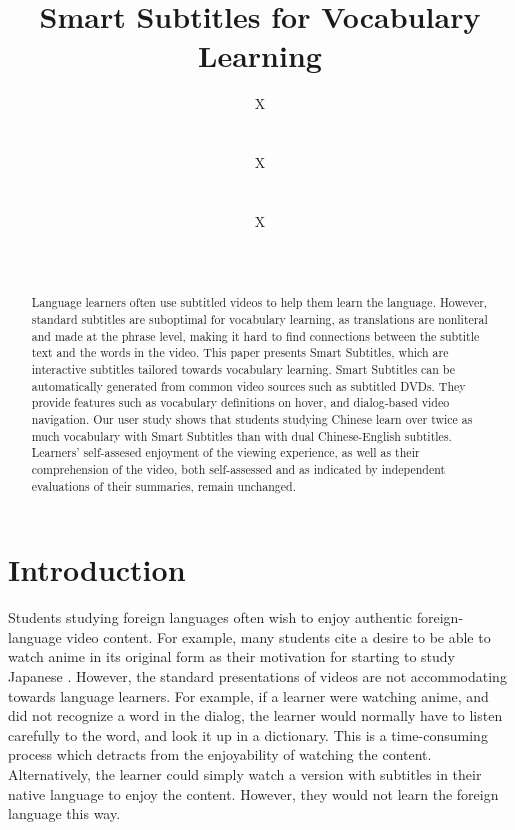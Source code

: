 \documentclass{sigchi}
\begin{document}
\title{Smart Subtitles for Vocabulary Learning}

\author{
  \alignauthor X\\
    \\
    \\
  \alignauthor X \\
    \\
    \\
  \alignauthor X\\
    \\
    \\
}

\maketitle

\begin{abstract}
Language learners often use subtitled videos to help
them learn the language. However, standard subtitles
are suboptimal for vocabulary learning, as
translations are nonliteral and made at the phrase
level, making it hard to find connections between the
subtitle text and the words in the video. This paper
presents Smart Subtitles, which are interactive subtitles
tailored towards vocabulary learning.
Smart Subtitles can be automatically generated from common video sources
such as subtitled DVDs.
They provide features such as vocabulary definitions on hover, and
dialog-based video navigation. Our user study shows
that students studying Chinese learn over twice as much
vocabulary with Smart Subtitles than with dual
Chinese-English subtitles. Learners' self-assesed enjoyment
of the viewing experience, as well as their comprehension
of the video, both self-assessed and
as indicated by independent evaluations of their summaries,
remain unchanged.
\end{abstract}



\section{Introduction}

Students studying foreign languages often wish to enjoy authentic foreign-language video content. For example, many students cite a desire to be able to watch anime in its original form as their motivation for starting to study Japanese \cite{anime}. However, the standard presentations of videos are not accommodating towards language learners. For example, if a learner were watching anime, and did not recognize a word in the dialog, the learner would normally have
to listen carefully to the word, and look it up in a dictionary. This is a time-consuming process which detracts from the enjoyability of watching the content. Alternatively, the learner could simply watch a version with subtitles in their native language to enjoy the content. However, they would not learn the foreign language this way.
\end{document}
